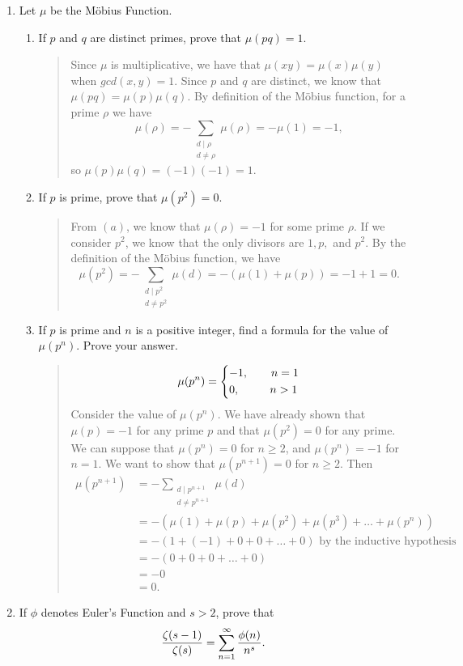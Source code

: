 \documentclass{hw}
\begin{document}
\begin{enumerate}
\newpage
\item Let $\mu$ be the M\"{o}bius Function.
\begin{enumerate}
\item If $p$ and $q$ are distinct primes, prove that $\mu(pq)=1$.
\begin{quote}
Since $\mu$ is multiplicative, we have that $\mu(xy)=\mu(x)\mu(y)$ when $gcd(x,y)=1$. Since $p$ and
$q$ are distinct, we know that $\mu(pq)=\mu(p)\mu(q)$. By definition of the M\"{o}bius function, for
a prime $\rho$ we have
\[
\mu(\rho)=-\sum_{\substack{d\mid \rho\\d\neq\rho}}\mu(\rho)=-\mu(1)=-1,
\]
so $\mu(p)\mu(q)=(-1)(-1)=1$.
\end{quote}
\item If $p$ is prime, prove that $\mu(p^{2})=0$.
\begin{quote}
From $(a)$, we know that $\mu(\rho)=-1$ for some prime $\rho$. If we consider $p^2$, we know that the
only divisors are $1,p,$ and $p^2$. By the definition of the M\"{o}bius function, we have
\[
\mu(p^2)=-\sum_{\substack{d\mid p^2\\d\neq p^2}}\mu(d)=-(\mu(1) + \mu(p))=-1 +1 = 0.
\]
\end{quote}
\item If $p$ is prime and $n$ is a positive integer, find a formula for the value of $\mu(p^{n})$.
Prove your answer.
\begin{quote}
\[
\mu(p^n)=
\begin{dcases*}
-1,\qquad n=1\\
0,\ \ \qquad n>1
\end{dcases*}
\]
Consider the value of $\mu(p^{n})$. We have already shown that $\mu(p)=-1$ for any prime $p$ and
that $\mu(p^2)=0$ for any prime. We can suppose that $\mu(p^{n})=0$ for $n\geq2$, and
$\mu(p^{n})=-1$ for $n=1$. We want to show that $\mu(p^{n+1})=0$ for $n\geq2$. Then
\begin{align*}
\mu(p^{n+1})&=-\sum_{\substack{d\mid p^{n+1}\\ d\neq p^{n+1}}}\mu(d)\\
&= -(\mu(1)+\mu(p)+\mu(p^{2})+\mu(p^{3})+\dots+\mu(p^{n}))\\
&= -(1+(-1)+0+0+\dots+0)\text{ by the inductive hypothesis}\\
&= -(0+0+0+\dots+0)\\
&= -0\\
&= 0.
\end{align*}
\end{quote}
\end{enumerate}

\item If $\phi$ denotes Euler's Function and $s>2$, prove that
\[
{\zeta(s-1)\over\zeta(s)}=\sum_{n=1}^{\infty}{\phi(n)\over n^{s}}.
\]
\end{enumerate}
\end{document}
